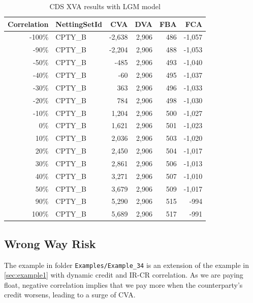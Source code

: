 \begin{table}[hbt]
\scriptsize
\begin{center}
\begin{tabular}{|r|l|r|r|r|r|}
\hline
Correlation & NettingSetId & CVA & DVA & FBA & FCA \\
\hline
-100\%  &  CPTY\_B  &  -2,638  &  2,906  &  486  &  -1,057 \\
 -90\%  &  CPTY\_B  &  -2,204  &  2,906  &  488  &  -1,053 \\
 -50\%  &  CPTY\_B  &    -485  &  2,906  &  493  &  -1,040 \\
 -40\%  &  CPTY\_B  &     -60  &  2,906  &  495  &  -1,037 \\
 -30\%  &  CPTY\_B  &     363  &  2,906  &  496  &  -1,033 \\
 -20\%  &  CPTY\_B  &     784  &  2,906  &  498  &  -1,030 \\
 -10\%  &  CPTY\_B  &   1,204  &  2,906  &  500  &  -1,027 \\
   0\%  &  CPTY\_B  &   1,621  &  2,906  &  501  &  -1,023 \\
  10\%  &  CPTY\_B  &   2,036  &  2,906  &  503  &  -1,020 \\
  20\%  &  CPTY\_B  &   2,450  &  2,906  &  504  &  -1,017 \\
  30\%  &  CPTY\_B  &   2,861  &  2,906  &  506  &  -1,013 \\
  40\%  &  CPTY\_B  &   3,271  &  2,906  &  507  &  -1,010 \\
  50\%  &  CPTY\_B  &   3,679  &  2,906  &  509  &  -1,017 \\
  90\%  &  CPTY\_B  &   5,290  &  2,906  &  515  &    -994 \\
 100\%  &  CPTY\_B  &   5,689  &  2,906  &  517  &    -991 \\
\hline
\end{tabular}
\caption{CDS XVA results with LGM model}
\end{center}
\end{table}

\subsection{Wrong Way Risk}%
\label{example:34}

The example in folder {\tt Examples/Example\_34} is an extension of the example in
\ref{sec:example1} with dynamic credit and IR-CR correlation. As we are paying
float, negative correlation implies that we pay more when the counterparty's credit
worsens, leading to a surge of CVA.

